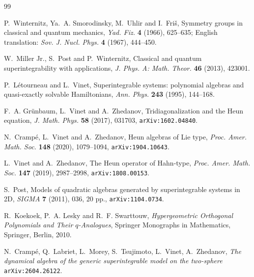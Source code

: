 \documentclass[11pt]{article}
\numberwithin{equation}{section}
\theoremstyle{definition}
\theoremstyle{remark}
\begin{document}
\begin{thebibliography}{99}

P.~Winternitz, Ya.~A. Smorodinsky, M.~Uhlir and I.~Fri\v{s},
Symmetry groups in classical and quantum mechanics,
\emph{Yad. Fiz.} \textbf{4} (1966), 625--635;
English translation:
\emph{Sov. J. Nucl. Phys.} \textbf{4} (1967), 444--450.

W.~Miller Jr., S.~Post and P.~Winternitz,
Classical and quantum superintegrability with applications,
\emph{J. Phys. A: Math. Theor.} \textbf{46} (2013), 423001.

P.~Létourneau and L.~Vinet,
Superintegrable systems: polynomial algebras and quasi-exactly solvable
Hamiltonians,
\emph{Ann. Phys.} \textbf{243} (1995), 144--168.

F.~A. Grünbaum, L.~Vinet and A.~Zhedanov,
Tridiagonalization and the Heun equation,
\emph{J. Math. Phys.} \textbf{58} (2017), 031703,
\texttt{arXiv:1602.04840}.

N.~Crampé, L.~Vinet and A.~Zhedanov,
Heun algebras of Lie type,
\emph{Proc. Amer. Math. Soc.} \textbf{148} (2020), 1079--1094,
\texttt{arXiv:1904.10643}.

L.~Vinet and A.~Zhedanov,
The Heun operator of Hahn-type,
\emph{Proc. Amer. Math. Soc.} \textbf{147} (2019), 2987--2998,
\texttt{arXiv:1808.00153}.

S.~Post,
Models of quadratic algebras generated by superintegrable systems in 2D,
\emph{SIGMA} \textbf{7} (2011), 036, 20 pp.,
\texttt{arXiv:1104.0734}.

R.~Koekoek, P.~A. Lesky and R.~F. Swarttouw,
\emph{Hypergeometric Orthogonal Polynomials and Their \(q\)-Analogues},
Springer Monographs in Mathematics, Springer, Berlin, 2010.

N.~Crampé, Q.~Labriet, L.~Morey, S.~Tsujimoto, L.~Vinet, A.~Zhedanov,
\emph{The dynamical algebra of the generic superintegrable model on the two-sphere}
\texttt{arXiv:2604.26122}.
\end{thebibliography}
\end{document}
